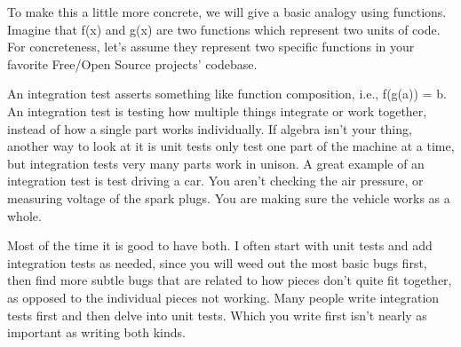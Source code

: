 To make this a little more concrete, we will give a basic analogy using functions. Imagine that f(x) and g(x) are two functions which represent two units of code. For concreteness, let's assume they represent two specific functions in your favorite Free/Open Source projects' codebase.

An integration test asserts something like function composition, i.e., f(g(a)) = b. An integration test is testing how multiple things integrate or work together, instead of how a single part works individually. If algebra isn't your thing, another way to look at it is unit tests only test one part of the machine at a time, but integration tests very many parts work in unison. A great example of an integration test is test driving a car. You aren't checking the air pressure, or measuring voltage of the spark plugs. You are making sure the vehicle works as a whole.

Most of the time it is good to have both. I often start with unit tests and add integration tests as needed, since you will weed out the most basic bugs first, then find more subtle bugs that are related to how pieces don't quite fit together, as opposed to the individual pieces not working. Many people write integration tests first and then delve into unit tests. Which you write first isn't nearly as important as writing both kinds.
